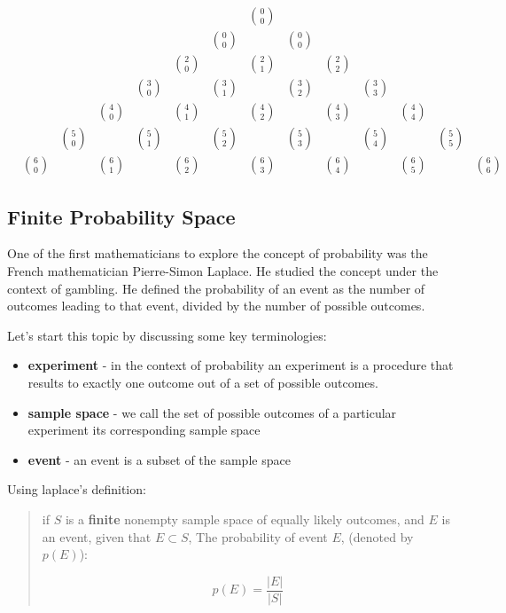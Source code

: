 \[
\begin{array}{ccccccccccc}
&&&&&&&{0 \choose 0}&&&&&\\
&&&&&&{0 \choose 0}&&{0 \choose 0}&&&&\\
&&&&&{2 \choose 0}&&{2 \choose 1}&&{2 \choose 2}&&&\\
&&&&{3 \choose 0}&&{3 \choose 1}&&{3 \choose 2}&&{3 \choose 3}&&\\
&&&{4 \choose 0}&&{4 \choose 1}&&{4 \choose 2}&&{4 \choose 3}&&{4 \choose 4}&\\
&&{5 \choose 0}&&{5 \choose 1}&&{5 \choose 2}&&{5 \choose 3}&&{5 \choose 4}&&{5 \choose 5}\\
&{6 \choose 0}&&{6 \choose 1}&&{6 \choose 2}&&{6 \choose 3}&&{6 \choose 4}&&{6 \choose 5}&&{6 \choose 6}
\end{array}
\]

\hypertarget{finite-probability-space}{%
\subsection{Finite Probability Space}\label{finite-probability-space}}

One of the first mathematicians to explore the concept of probability
was the French mathematician Pierre-Simon Laplace. He studied the
concept under the context of gambling. He defined the probability of an
event as the number of outcomes leading to that event, divided by the
number of possible outcomes.

Let's start this topic by discussing some key terminologies:

\begin{itemize}
\tightlist
\item
  \textbf{experiment} - in the context of probability an experiment is a
  procedure that results to exactly one outcome out of a set of possible
  outcomes.
\item
  \textbf{sample space} - we call the set of possible outcomes of a
  particular experiment its corresponding sample space
\item
  \textbf{event} - an event is a subset of the sample space
\end{itemize}

Using laplace's definition:

\begin{quote}
if \textbf{\(S\)} is a \textbf{finite} nonempty sample space of equally
likely outcomes, and \textbf{\(E\)} is an event, given that
\textbf{\(E \subset S\)}, The probability of event \textbf{\(E\)},
(denoted by \textbf{\(p(E)\)}):

\[
p(E)=\frac{|E|}{|S|}
\]
\end{quote}

